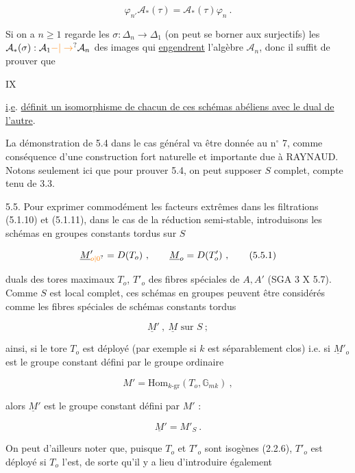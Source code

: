 \[
\varphi_{n'}\mathcal A_*(\tau)=\mathcal A_*(\tau)\varphi_n\ .
\]

 Si on a $n\geq1$   regarde les $\sigma:\Delta_n\to\Delta_1$  (on peut se borner aux surjectifs)  les $\mathcal A_*(\sigma):\mathcal A_1\unsure{-|\to}\mathcal A_n$  des images qui \uline{engendrent} l'algèbre $\mathcal A_n$, donc il suffit de prouver que


\hfill IX

\uline{i}.\uline{e}. \uline{définit un isomorphisme de chacun de ces schémas abéliens avec le dual de l'autre}.

La démonstration de 5.4 dans le cas général va être donnée au n$^\circ$ 7, comme conséquence d'une construction fort naturelle et importante due à RAYNAUD. Notons seulement ici que pour prouver 5.4, on peut supposer $S$ complet, compte tenu de 3.3.

5.5. Pour exprimer commodément les facteurs extrêmes dans les filtrations (5.1.10) et (5.1.11), dans le cas de la réduction semi-stable, introduisons les schémas en groupes constants tordus sur $S$

\[
\underline{M}'_{\unsure{o|0}}=D(T_o)\ ,\qquad\underline{M}_o=D(T'_o)\ ,\tag*{(5.5.1)}
\]

duals des tores maximaux $T_o$, $T'_o$ des fibres spéciales de $A,A'$ (SGA 3 X 5.7). Comme $S$ est local complet, ces schémas en groupes peuvent être considérés comme les fibres spéciales de schémas constants tordus

\[
\underline{M}'\ ,\ \underline{M}\text{ sur }S\ ;\tag*{(5.5.2)}
\]

ainsi, si le tore $T_o$ est déployé (par exemple si $k$ est séparablement clos) i.e. si $\underline{M}'_o$ est le groupe constant défini par le groupe ordinaire

\[
M'=\mathrm{Hom}_{k\text{-}\mathrm{gr}}(T_o,\mathbb{G}_{mk})\ ,\tag*{(5.5.3)}
\]

alors $\underline{M}'$ est le groupe constant défini par $M'$ :

\[
\underline{M}'=M'_S\ .
\]

On peut d'ailleurs noter que, puisque $T_o$ et $T'_o$ sont isogènes (2.2.6), $T'_o$ est déployé si $T_o$ l'est, de sorte qu'il y a lieu d'introduire également

